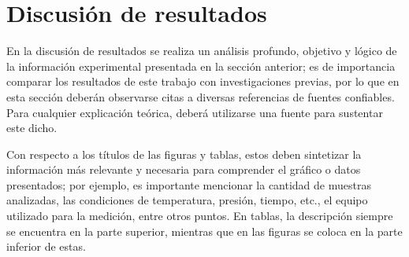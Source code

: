 \documentclass[fleqn,10pt]{SelfArx} %
\begin{document}
\section{Discusión de resultados} %

En la discusión de resultados se realiza un análisis profundo, objetivo y lógico de la información experimental presentada en la sección anterior; es de importancia comparar los resultados de este trabajo con investigaciones previas, por lo que en esta sección deberán observarse citas a diversas referencias de fuentes confiables. Para cualquier explicación teórica, deberá utilizarse una fuente para sustentar este dicho.

Con respecto a los títulos de las figuras y tablas, estos deben sintetizar la información más relevante y necesaria para comprender el gráfico o datos presentados; por ejemplo, es importante mencionar la cantidad de muestras analizadas, las condiciones de temperatura, presión, tiempo, etc., el equipo utilizado para la medición, entre otros puntos. En tablas, la descripción siempre se encuentra en la parte superior, mientras que en las figuras se coloca en la parte inferior de estas.


\end{document}
